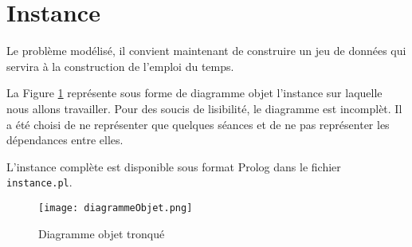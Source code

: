 \section{Instance}

Le problème modélisé, il convient maintenant de construire un jeu de données qui
servira à la construction de l'emploi du temps.

La Figure \ref{fig:objet} représente sous forme de diagramme objet l'instance
sur laquelle nous allons travailler. Pour des soucis de lisibilité, le diagramme
est incomplèt. Il a été choisi de ne représenter que quelques séances et de ne
pas représenter les dépendances entre elles.

L'instance complète est disponible sous format Prolog dans le fichier
\texttt{instance.pl}.

\begin{landscape}

    \begin{figure}[t]
        \texttt{[image: diagrammeObjet.png]}
            \caption{\label{fig:objet} Diagramme objet tronqué}
    \end{figure}

\end{landscape}

